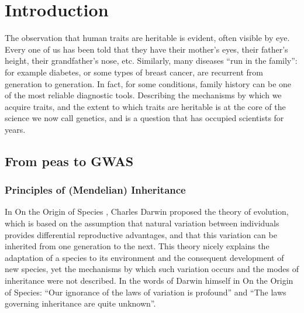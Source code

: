 \chapter{Introduction}  %

The observation that human traits are heritable is evident, often visible by eye. 
Every one of us has been told that they have their mother’s eyes, their father’s height, their grandfather’s nose, etc. 
Similarly, many diseases “run in the family”: for example diabetes, or some types of breast cancer, are recurrent from generation to generation. 
In fact, for some conditions, family history can be one of the most reliable diagnostic tools. 
Describing the mechanisms by which we acquire traits, and the extent to which traits are heritable is at the core of the science we now call genetics, and is a question that has occupied scientists for years.

\section{From peas to GWAS}  %

\subsection{Principles of (Mendelian) Inheritance} %

In On the Origin of Species \cite{darwin1859origin}, Charles Darwin proposed the theory of evolution, which is based on the assumption that natural variation between individuals provides differential reproductive advantages, and that this variation can be inherited from one generation to the next. 
This theory nicely explains the adaptation of a species to its environment and the consequent development of new species, yet the mechanisms by which such variation occurs and the modes of inheritance were not described. 
In the words of Darwin himself in On the Origin of Species: “Our ignorance of the laws of variation is profound” and “The laws governing inheritance are quite unknown”.\\

